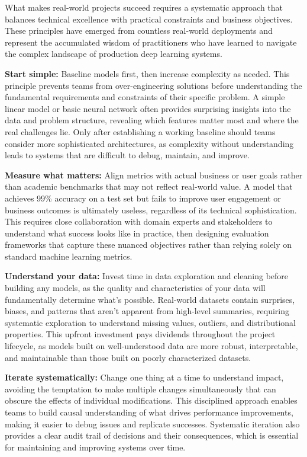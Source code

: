 What makes real-world projects succeed requires a systematic approach that balances technical excellence with practical constraints and business objectives. These principles have emerged from countless real-world deployments and represent the accumulated wisdom of practitioners who have learned to navigate the complex landscape of production deep learning systems.

\textbf{Start simple:} Baseline models first, then increase complexity as needed. This principle prevents teams from over-engineering solutions before understanding the fundamental requirements and constraints of their specific problem. A simple linear model or basic neural network often provides surprising insights into the data and problem structure, revealing which features matter most and where the real challenges lie. Only after establishing a working baseline should teams consider more sophisticated architectures, as complexity without understanding leads to systems that are difficult to debug, maintain, and improve.

\textbf{Measure what matters:} Align metrics with actual business or user goals rather than academic benchmarks that may not reflect real-world value. A model that achieves 99\% accuracy on a test set but fails to improve user engagement or business outcomes is ultimately useless, regardless of its technical sophistication. This requires close collaboration with domain experts and stakeholders to understand what success looks like in practice, then designing evaluation frameworks that capture these nuanced objectives rather than relying solely on standard machine learning metrics.

\textbf{Understand your data:} Invest time in data exploration and cleaning before building any models, as the quality and characteristics of your data will fundamentally determine what's possible. Real-world datasets contain surprises, biases, and patterns that aren't apparent from high-level summaries, requiring systematic exploration to understand missing values, outliers, and distributional properties. This upfront investment pays dividends throughout the project lifecycle, as models built on well-understood data are more robust, interpretable, and maintainable than those built on poorly characterized datasets.

\textbf{Iterate systematically:} Change one thing at a time to understand impact, avoiding the temptation to make multiple changes simultaneously that can obscure the effects of individual modifications. This disciplined approach enables teams to build causal understanding of what drives performance improvements, making it easier to debug issues and replicate successes. Systematic iteration also provides a clear audit trail of decisions and their consequences, which is essential for maintaining and improving systems over time.

